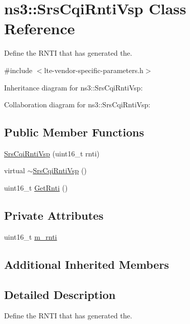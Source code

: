 \hypertarget{classns3_1_1SrsCqiRntiVsp}{}\section{ns3\+:\+:Srs\+Cqi\+Rnti\+Vsp Class Reference}
\label{classns3_1_1SrsCqiRntiVsp}


Define the R\+N\+TI that has generated the.  




{\ttfamily \#include $<$lte-\/vendor-\/specific-\/parameters.\+h$>$}



Inheritance diagram for ns3\+:\+:Srs\+Cqi\+Rnti\+Vsp\+:


Collaboration diagram for ns3\+:\+:Srs\+Cqi\+Rnti\+Vsp\+:
\subsection*{Public Member Functions}
\begin{DoxyCompactItemize}
\item 
\hyperlink{classns3_1_1SrsCqiRntiVsp_aa0225fdfd640e7172b89c4636e99a719}{Srs\+Cqi\+Rnti\+Vsp} (uint16\+\_\+t rnti)
\item 
virtual \hyperlink{classns3_1_1SrsCqiRntiVsp_a6e6738c94c943e7c11f61f7d1ce62052}{$\sim$\+Srs\+Cqi\+Rnti\+Vsp} ()
\item 
uint16\+\_\+t \hyperlink{classns3_1_1SrsCqiRntiVsp_a622d9726c27cbbba284488ed32048a8e}{Get\+Rnti} ()
\end{DoxyCompactItemize}
\subsection*{Private Attributes}
\begin{DoxyCompactItemize}
\item 
uint16\+\_\+t \hyperlink{classns3_1_1SrsCqiRntiVsp_aa988641532636d19b04ff623426db10a}{m\+\_\+rnti}
\end{DoxyCompactItemize}
\subsection*{Additional Inherited Members}


\subsection{Detailed Description}
Define the R\+N\+TI that has generated the. 

